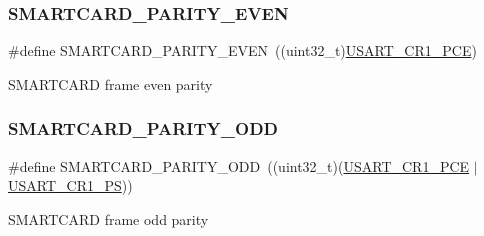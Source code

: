\subsubsection{\texorpdfstring{S\+M\+A\+R\+T\+C\+A\+R\+D\+\_\+\+P\+A\+R\+I\+T\+Y\+\_\+\+E\+V\+EN}{SMARTCARD\_PARITY\_EVEN}}
{\footnotesize\ttfamily \#define S\+M\+A\+R\+T\+C\+A\+R\+D\+\_\+\+P\+A\+R\+I\+T\+Y\+\_\+\+E\+V\+EN~((uint32\+\_\+t)\hyperlink{group___peripheral___registers___bits___definition_ga60f8fcf084f9a8514efafb617c70b074}{U\+S\+A\+R\+T\+\_\+\+C\+R1\+\_\+\+P\+CE})}

S\+M\+A\+R\+T\+C\+A\+RD frame even parity \mbox{\label{group___s_m_a_r_t_c_a_r_d___parity_gaef2239030beeb07577e43965b013f65d}} 
\subsubsection{\texorpdfstring{S\+M\+A\+R\+T\+C\+A\+R\+D\+\_\+\+P\+A\+R\+I\+T\+Y\+\_\+\+O\+DD}{SMARTCARD\_PARITY\_ODD}}
{\footnotesize\ttfamily \#define S\+M\+A\+R\+T\+C\+A\+R\+D\+\_\+\+P\+A\+R\+I\+T\+Y\+\_\+\+O\+DD~((uint32\+\_\+t)(\hyperlink{group___peripheral___registers___bits___definition_ga60f8fcf084f9a8514efafb617c70b074}{U\+S\+A\+R\+T\+\_\+\+C\+R1\+\_\+\+P\+CE} $\vert$ \hyperlink{group___peripheral___registers___bits___definition_ga2e159d36ab2c93a2c1942df60e9eebbe}{U\+S\+A\+R\+T\+\_\+\+C\+R1\+\_\+\+PS}))}

S\+M\+A\+R\+T\+C\+A\+RD frame odd parity 